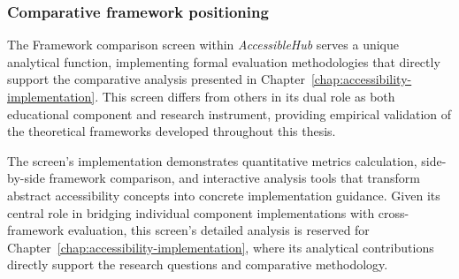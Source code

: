 \subsubsection{Comparative framework positioning}
\label{subsubsec:comparative-framework-positioning}

The Framework comparison screen within \textit{AccessibleHub} serves a unique analytical function, implementing formal evaluation methodologies that directly support the comparative analysis presented in Chapter~\ref{chap:accessibility-implementation}. This screen differs from others in its dual role as both educational component and research instrument, providing empirical validation of the theoretical frameworks developed throughout this thesis.

The screen's implementation demonstrates quantitative metrics calculation, side-by-side framework comparison, and interactive analysis tools that transform abstract accessibility concepts into concrete implementation guidance. Given its central role in bridging individual component implementations with cross-framework evaluation, this screen's detailed analysis is reserved for Chapter~\ref{chap:accessibility-implementation}, where its analytical contributions directly support the research questions and comparative methodology.


\newpage

